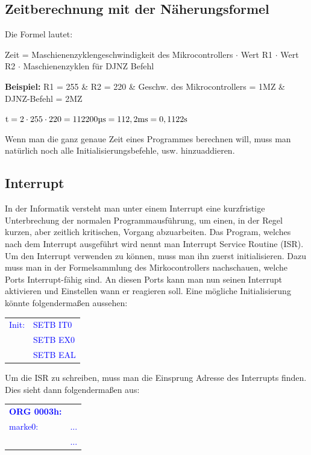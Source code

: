 \documentclass[12pt,a4paper]{article}
\begin{document}
\subsection{Zeitberechnung mit der Näherungsformel}
    Die Formel lautet:
    \begin{center}
        Zeit = Maschienenzyklengeschwindigkeit des Mikrocontrollers $\cdot$ Wert R1 $\cdot$ Wert R2 $\cdot$ Maschienenzyklen für DJNZ Befehl
    \end{center}
    \textbf{Beispiel:}\newline
    R1 = 255 \& R2 = 220 \& Geschw. des Mikrocontrollers = 1MZ \& DJNZ-Befehl = 2MZ\newline
    \begin{center}
        $\text{t} = 2 \cdot 255 \cdot 220 = 112200\text{\textmu s} = 112,2\text{ms} = 0,1122\text{s}$    
    \end{center}
    Wenn man die ganz genaue Zeit eines Programmes berechnen will, muss man natürlich noch alle Initialisierungsbefehle, usw. hinzuaddieren.
    
\subsection{Interrupt}
    In der Informatik versteht man unter einem Interrupt eine kurzfristige Unterbrechung der normalen Programmausführung, um einen, in der Regel kurzen, aber zeitlich kritischen, Vorgang abzuarbeiten. Das Program, welches nach dem Interrupt ausgeführt wird nennt man Interrupt Service Routine (ISR).
    Um den Interrupt verwenden zu können, muss man ihn zuerst initialisieren. Dazu muss man in der Formelsammlung des Mirkocontrollers nachschauen, welche Ports Interrupt-fähig sind. An diesen Ports kann man nun seinen Interrupt aktivieren und Einstellen wann er reagieren soll.\newline
    Eine mögliche Initialisierung könnte folgendermaßen aussehen:
    \begin{table}[h]
        \centering
        \textcolor{blue}{
        \begin{tabularx}{5cm}{XX}
            Init: & SETB IT0\\
            &SETB EX0\\
            &SETB EAL\\
        \end{tabularx}}
    \end{table}\newline
Um die ISR zu schreiben, muss man die Einsprung Adresse des Interrupts finden.\newline
    Dies sieht dann folgendermaßen aus:
    \begin{table}[h]
        \centering
        \textcolor{blue}{
        \begin{tabularx}{6cm}{XX}
            \textbf{ORG 0003h:} & \\
            marke0: & ...\\
            & ...\\
        \end{tabularx}}
    \end{table}
\end{document}
